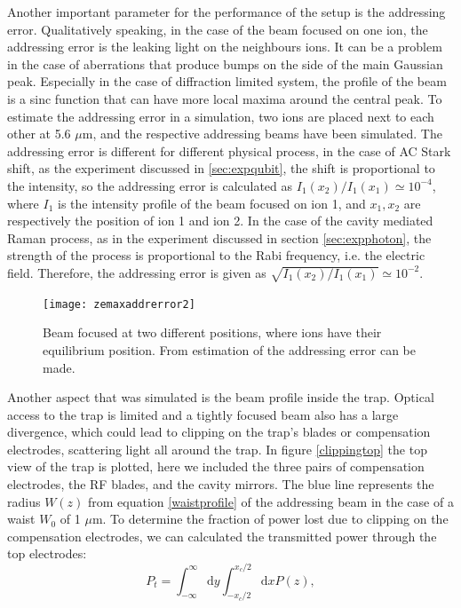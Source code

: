 Another important parameter for the performance of the setup is the addressing error. Qualitatively speaking, in the case of the beam focused on one ion, the addressing error is the leaking light on the neighbours ions. It can be a problem in the case of aberrations that produce bumps on the side of the main Gaussian peak. Especially in the case of diffraction limited system, the profile of the beam is a sinc function that can have more local maxima around the central peak. To estimate the addressing error in a simulation, two ions are placed next to each other at 5.6 $\mu$m, and the respective addressing beams have been simulated. The addressing error is different for different physical process, in the case of AC Stark shift, as the experiment discussed in \ref{sec:expqubit}, the shift is proportional to the intensity, so the addressing error is calculated as $I_1(x_2)/I_1(x_1) \simeq 10^{-4}$, where $I_{1}$ is the intensity profile of the beam focused on ion 1, and $x_1,x_2$ are respectively the position of ion 1 and ion 2. In the case of the cavity mediated Raman process, as in the experiment discussed in section \ref{sec:expphoton}, the strength of the process is proportional to the Rabi frequency, i.e. the electric field. Therefore, the addressing error is given as $\sqrt{I_1(x_2)/I_1(x_1)} \simeq 10^{-2}$.
 \begin{figure}
 \centering
 \texttt{[image: zemaxaddrerror2]}
 \caption{Beam focused at two different positions, where ions have their equilibrium position. From estimation of the addressing error can be made.}
 \label{zemaxaddrerror.png}
 \end{figure}
Another aspect that was simulated is the beam profile inside the trap. Optical access to the trap is limited and a tightly focused beam also has a large divergence, which could lead to clipping on the trap's blades or compensation electrodes, scattering light all around the trap. In figure \ref{clippingtop} the top view of the trap is plotted, here we included the three pairs of compensation electrodes, the RF blades, and the cavity mirrors. The blue line represents the radius $W(z)$ from equation \ref{waistprofile} of the addressing beam in the case of a waist $W_0$ of 1 $\mu$m. To determine the fraction of power lost due to clipping on the compensation electrodes, we can calculated the transmitted power through the top electrodes:
\begin{equation}
P_{t} = \int_{-\infty}^{\infty}\text{d}y \int_{-x_c/2}^{x_c/2}\text{d}x P(z),
\end{equation}
